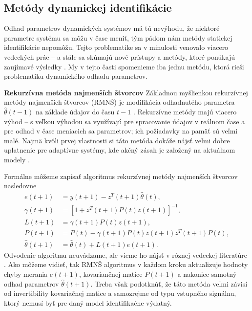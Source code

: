 \subsection{Metódy dynamickej identifikácie}
Odhad parametrov dynamických systémov má tú nevýhodu, že niektoré parametre systému sa môžu v čase meniť, tým pádom nám metódy statickej identifikácie nepomôžu. Tejto problematike sa v minulosti venovalo viacero vedeckých prác \cite{mehrkanoon:dyn_param_est:2012} -- \cite{stortelder:dyn_param_est:1996} a stále sa skúmajú nové prístupy a metódy, ktoré ponúkajú zaujímavé výsledky \cite{hou:dyn_param_est_nn:2019}. My v tejto časti spomenieme iba jednu metódu, ktorá rieši problematiku dynamického odhadu parametrov.

\textbf{Rekurzívna metóda najmenších štvorcov}
\newline
Základnou myšlienkou rekurzívnej metódy najmenších štvorcov (RMNŠ) je modifikácia odhadnutého parametra $ \hat{\theta}(t-1) $ na základe údajov do času $ t-1 $ \cite{hostetter:recursive_est:1987}. Rekurzívne metódy majú viacero výhod -- s veľkou výhodou sa využívajú pre spracovanie údajov v reálnom čase a pre odhad v čase meniacich sa parametrov; ich požiadavky na pamäť sú veľmi malé. Najmä kvôli prvej vlastnosti si táto metóda dokáže nájsť veľmi dobre uplatnenie pre adaptívne systémy, kde akčný zásah je založený na aktuálnom modely \cite{koo:rmns:2019}.

Formálne môžeme zapísať algoritmus rekurzívnej metódy najmenších štvorcov nasledovne
\begin{equation}
	\begin{split}
		e(t+1) &= y(t+1) - z^T(t+1)\hat{\theta}(t), \\
		\gamma(t+1) &= \left[ 1 + z^T(t+1)P(t)z(t+1) \right]^{-1}, \\
		L(t+1) &= \gamma(t+1)P(t)z(t+1), \\
		P(t+1) &= P(t) - \gamma(t+1)P(t)z(t+1)z^T(t+1)P(t), \\
		\hat{\theta}(t+1) &= \hat{\theta}(t) + L(t+1)e(t+1). 
	\end{split}
\end{equation}
Odvodenie algoritmu neuvádzame, ale vieme ho nájsť v rôznej vedeckej literatúre \cite{fikar:identifikacia:1999}. Ako môžeme vidieť, tak RMNŠ algoritmus v každom kroku aktualizuje hodnoty chyby merania $ e(t+1) $, kovariančnej matice $ P(t+1) $ a nakoniec samotný odhad parametrov $ \hat{\theta}(t+1) $. Treba však podotknúť, že táto metóda veľmi závisí od invertibility kovariačnej matice a samozrejme od typu vstupného signálnu, ktorý nemusí byť pre daný model identifikačne výdatný.


